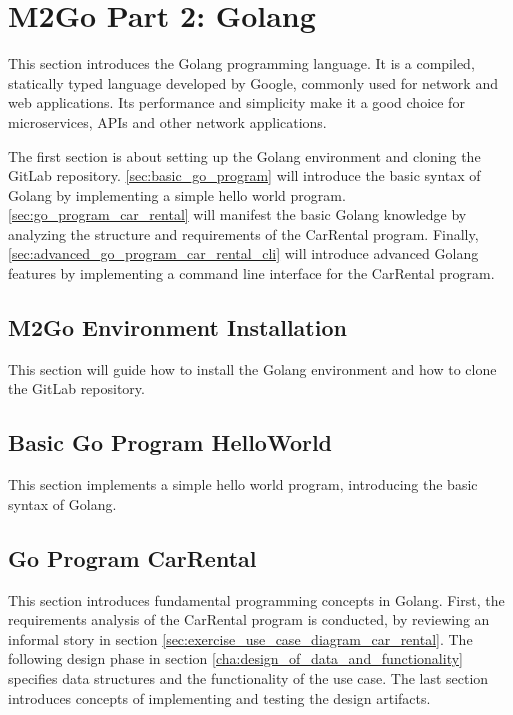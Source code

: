 \chapter{M2Go Part 2: Golang}
\label{cha:golang}
This section introduces the Golang programming language.
It is a compiled, statically typed language developed by Google, commonly used for network and web applications.
Its performance and simplicity make it a good choice for microservices, APIs and other network applications.

The first section is about setting up the Golang environment and cloning the GitLab repository.
\autoref{sec:basic_go_program} will introduce the basic syntax of Golang by implementing a simple hello world program.
\autoref{sec:go_program_car_rental} will manifest the basic Golang knowledge by analyzing the structure and requirements of the CarRental program.
Finally, \autoref{sec:advanced_go_program_car_rental_cli} will introduce advanced Golang features by implementing a command line interface for the CarRental program.


\section{M2Go Environment Installation}
\label{sec:m2go_env_installation}
This section will guide how to install the Golang environment and how to clone the GitLab repository.





\section{Basic Go Program HelloWorld}
\label{sec:basic_go_program}
This section implements a simple hello world program, introducing the basic syntax of Golang.




\section{Go Program CarRental}
\label{sec:go_program_car_rental}
This section introduces fundamental programming concepts in Golang.
First, the requirements analysis of the CarRental program is conducted, by reviewing an informal story in section \ref{sec:exercise_use_case_diagram_car_rental}.
The following design phase in section \ref{cha:design_of_data_and_functionality} specifies data structures and the functionality of the use case.
The last section introduces concepts of implementing and testing the design artifacts.


